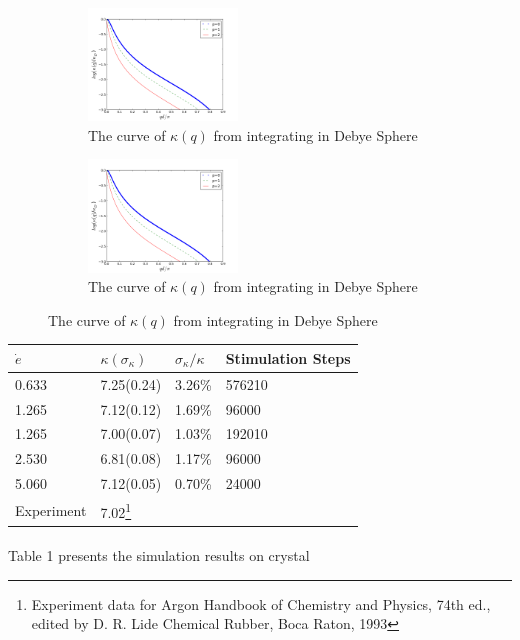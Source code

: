 \documentclass[twocolumn]{article}
\begin{document}
\paragraph*{}
\begin{figure}
\begin{subfigure}[htb!]{.5\linewidth}
    \centering
    \caption{The curve of $\kappa(q)$ from integrating in Debye Sphere}
    \includegraphics[height=3cm]{DebyeIn.png}
\end{subfigure}
\begin{subfigure}[htb!]{.5\linewidth}
    \centering
    \caption{The curve of $\kappa(q)$ from integrating in Debye Sphere}
    \includegraphics[height=3cm]{DebyeIn.png}
\end{subfigure}
\end{figure}
\begin{table}
\begin{tabular}{p{1.6cm}|p{1.7cm} p{1.7cm} p{1.7cm}}
\hline
\hline
{$\dot{e}$}&{$\kappa(\sigma_\kappa)$ }&{$\sigma_\kappa/\kappa$}&{Stimulation Steps}\\
\hline
0.633                              &   7.25(0.24)   & 3.26\%         & 576210\\
1.265                              &   7.12(0.12)   & 1.69\%         & 96000\\
1.265                              &   7.00(0.07)   & 1.03\%         & 192010\\
2.530                              &   6.81(0.08)   & 1.17\%         & 96000\\
5.060                              &   7.12(0.05)   & 0.70\%        & 24000\\
\hline
Experiment                         &   7.02\footnote{Experiment data for Argon    Handbook of Chemistry and Physics, 74th ed., edited by D. R. Lide Chemical Rubber, Boca Raton, 1993} \\
\hline
\end{tabular}
\end{table}
\paragraph*{}
Table 1 presents the simulation results on crystal 
\end{document}
